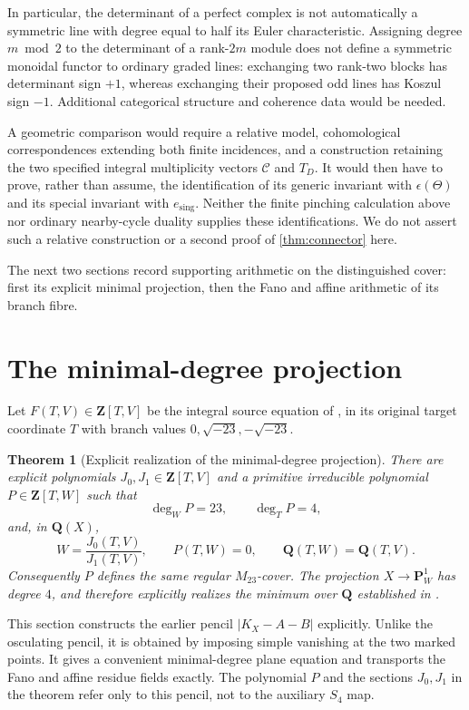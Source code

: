 \documentclass[11pt]{amsart}
\newtheorem{theorem}{Theorem}[section]
\theoremstyle{definition}
\theoremstyle{remark}
\newcommand{\QQ}{\mathbf Q}
\newcommand{\ZZ}{\mathbf Z}
\newcommand{\PP}{\mathbf P}
\begin{document}
In particular, the determinant of a perfect complex \cite{KnudsenMumford}
is not automatically
a symmetric line with degree equal to half its Euler characteristic.
Assigning degree $m\bmod2$ to the determinant of a rank-$2m$ module
does not define a symmetric monoidal functor to ordinary graded lines:
exchanging two rank-two blocks has determinant sign $+1$, whereas
exchanging their proposed odd lines has Koszul sign $-1$.
Additional categorical structure and coherence data would be needed.

A geometric comparison would require a relative model, cohomological
correspondences extending both finite incidences, and a construction
retaining the two specified integral multiplicity vectors
$\mathcal C$ and $T_D$.  It would then have to prove, rather than assume,
the identification of its generic invariant with $\epsilon(\Theta)$ and
its special invariant with $e_{\mathrm{sing}}$.  Neither the finite
pinching calculation above nor ordinary nearby-cycle duality
\cite{LuZheng} supplies these identifications.  We do not assert such a
relative construction or a second proof of \cref{thm:connector} here.

The next two sections record supporting arithmetic on the distinguished
cover: first its explicit minimal projection, then the Fano and affine
arithmetic of its branch fibre.

\section{The minimal-degree projection}
\label{sec:adjoints}

Let $F(T,V)\in\ZZ[T,V]$ be the integral source equation of
\cite{HJLPPZ}, in its original target coordinate $T$ with branch
values $0,\sqrt{-23},-\sqrt{-23}$.

\begin{theorem}[Explicit realization of the minimal-degree projection]
\label{thm:main}
There are explicit polynomials $J_0,J_1\in\ZZ[T,V]$ and a primitive
irreducible polynomial $P\in\ZZ[T,W]$ such that
\[
 \deg_WP=23,\qquad \deg_TP=4,
\]
and, in $\QQ(X)$,
\[
 W=\frac{J_0(T,V)}{J_1(T,V)},\qquad P(T,W)=0,
 \qquad \QQ(T,W)=\QQ(T,V).
\]
Consequently $P$ defines the same regular $M_{23}$-cover.  The projection
$X\to\PP^1_W$ has degree $4$, and therefore explicitly realizes the minimum
over $\QQ$ established in \cite[Remark~3.4]{HJLPPZ}.
\end{theorem}



This section constructs the earlier pencil $|K_X-A-B|$ explicitly.
Unlike the osculating pencil, it is obtained by imposing simple
vanishing at the two marked points.
It gives a convenient minimal-degree plane equation and transports
the Fano and affine residue fields exactly.
The polynomial $P$ and the sections $J_0,J_1$ in the theorem refer
only to this pencil, not to the auxiliary $S_4$ map.
\end{document}
